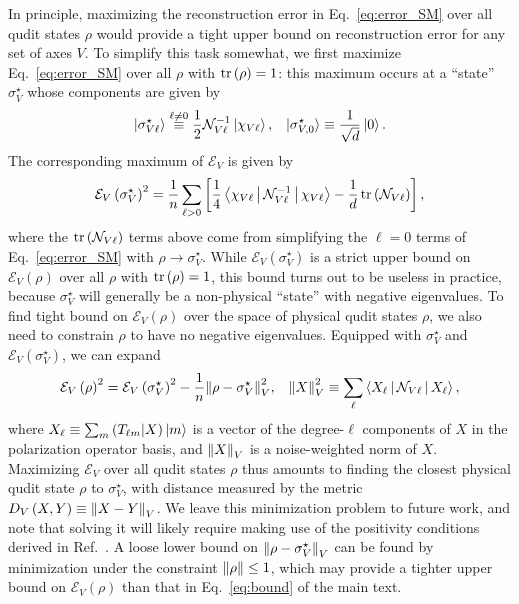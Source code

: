 \documentclass[nofootinbib,twocolumn]{revtex4-1}
\newcommand{\f}[2]{\dfrac{#1}{#2}} %
\newcommand{\p}[1]{\left(#1\right)} %
\renewcommand{\sp}[1]{\left[#1\right]} %
\newcommand{\bk}{\Braket} %
\newcommand{\E}{\mathcal{E}}
\newcommand{\N}{\mathcal{N}}
\def\obk#1{\mathinner{({#1})}}
\begin{document}
In principle, maximizing the reconstruction error in Eq.~\eqref{eq:error_SM} over all qudit states $\rho$ would provide a tight upper bound on reconstruction error for any set of axes $V$.
To simplify this task somewhat, we first maximize Eq.~\eqref{eq:error_SM} over all $\rho$ with $\tr\p\rho=1$: this maximum occurs at a ``state'' $\sigma_V^\star$ whose components are given by
\begin{align}
  \ket{\sigma_{V\ell}^\star} \stackrel{\ell\ne0}{\equiv}
  \f12 \N_{V\ell}^{-1} \ket{\chi_{V\ell}},
  &&
  \ket{\sigma_{V,0}^\star} \equiv \f1{\sqrt{d}} \ket{0}.
\end{align}
The corresponding maximum of $\E_V$ is given by
\begin{align}
  \E_V\p{\sigma_V^\star}^2 = \f1n \sum_{\ell>0}
  \sp{\f14 \bk{\chi_{V\ell}|\N_{V\ell}^{-1}|\chi_{V\ell}}
  - \f1d \tr\p{\N_{V\ell}}},
\end{align}
where the $\tr\p{\N_{V\ell}}$ terms above come from simplifying the $\ell=0$ terms of Eq.~\eqref{eq:error_SM} with $\rho\to\sigma_V^\star$.
While $\E_V\p{\sigma_V^\star}$ is a strict upper bound on $\E_V\p{\rho}$ over all $\rho$ with $\tr\p{\rho}=1$, this bound turns out to be useless in practice, because $\sigma_V^\star$ will generally be a non-physical ``state'' with negative eigenvalues.
To find tight bound on $\E_V\p{\rho}$ over the space of physical qudit states $\rho$, we also need to constrain $\rho$ to have no negative eigenvalues.
Equipped with $\sigma_V^\star$ and $\E_V\p{\sigma_V^\star}$, we can expand
\begin{align}
  \E_V\p{\rho}^2 = \E_V\p{\sigma_V^\star}^2
  - \f1n \norm{\rho-\sigma_V^\star}_V^2,
  &&
  \norm{X}_V^2 \equiv \sum_\ell \bk{X_\ell|\N_{V\ell}|X_\ell},
\end{align}
where $X_\ell\equiv\sum_m\obk{T_{\ell m}|X}\ket{m}$ is a vector of the degree-$\ell$ components of $X$ in the polarization operator basis, and $\norm{X}_V$ is a noise-weighted norm of $X$.
Maximizing $\E_V$ over all qudit states $\rho$ thus amounts to finding the closest physical qudit state $\rho$ to $\sigma_V^\star$, with distance measured by the metric $D_V\p{X,Y}\equiv\norm{X-Y}_V$.
We leave this minimization problem to future work, and note that solving it will likely require making use of the positivity conditions derived in Ref.~\cite{kryszewski2006positivity}.
A loose lower bound on $\norm{\rho-\sigma_V^\star}_V$ can be found by minimization under the constraint $\norm{\rho}\le1$, which may provide a tighter upper bound on $\E_V\p{\rho}$ than that in Eq.~\eqref{eq:bound} of the main text.
\end{document}
